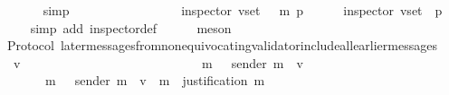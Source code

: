 \begin{isabellebody}
\ \ \ \ \ \ \isamarkupfalse%
\ simp\ \ \ \ \ \ \ \ \ \isanewline
\ \ \isamarkupfalse%
\isanewline
\ \ \isamarkupfalse%
\ \isamarkupfalse%
\ {\isachardoublequoteopen}inspector\ {\isacharparenleft}v{\isacharunderscore}set{\isacharcomma}\ {\isasymsigma}\ {\isasymunion}\ {\isacharbraceleft}m{\isacharbraceright}{\isacharcomma}\ p{\isacharparenright}{\isachardoublequoteclose}\isanewline
\ \ \ \ \isamarkupfalse%
\ {\isacartoucheopen}inspector\ {\isacharparenleft}v{\isacharunderscore}set{\isacharcomma}\ {\isasymsigma}{\isacharcomma}\ p{\isacharparenright}{\isacartoucheclose}\isanewline
\ \ \ \ \isamarkupfalse%
\ {\isacharparenleft}simp\ add{\isacharcolon}\ inspector{\isacharunderscore}def{\isacharparenright}\isanewline
\ \ \ \ \isamarkupfalse%
\ meson\isanewline
{}\isamarkupfalse%
%
\endisatagproof
{\isafoldproof}%
%
\isadelimproof
\isanewline
%
\endisadelimproof
\isanewline
\isanewline
\isanewline
\isanewline
\isanewline
\isanewline
\isanewline
\isanewline
\isanewline
\isanewline
\isanewline
\isanewline
\isanewline
{}\isamarkupfalse%
\ {\isacharparenleft}\ Protocol{\isacharparenright}\ later{\isacharunderscore}messages{\isacharunderscore}from{\isacharunderscore}non{\isacharunderscore}equivocating{\isacharunderscore}validator{\isacharunderscore}include{\isacharunderscore}all{\isacharunderscore}earlier{\isacharunderscore}messages\ {\isacharcolon}\isanewline
\ \ {\isachardoublequoteopen}{\isasymforall}\ v\ {\isasymsigma}\ {\isasymsigma}{}\ {\isasymsigma}{}{\isachardot}\ {\isasymsigma}\ {\isasymin}\ {\isasymSigma}\ {\isasymand}\ {\isasymsigma}{}\ {\isasymin}\ {\isasymSigma}\ {\isasymand}\ {\isasymsigma}{}\ {\isasymsubseteq}\ {\isasymsigma}\ {\isasymand}\ {\isasymsigma}{}\ {\isasymsubseteq}\ {\isasymsigma}\ {\isasymand}\ {\isasymsigma}{}\ {\isasyminter}\ {\isasymsigma}{}\ {\isacharequal}\ {\isasymemptyset}\isanewline
\ \ {\isasymlongrightarrow}\ {\isacharparenleft}{\isasymforall}\ m{}\ {\isasymin}\ {\isasymsigma}{}{\isachardot}\ sender\ m{}\ {\isacharequal}\ v\ \isanewline
\ \ \ \ \ \ {\isasymlongrightarrow}\ {\isacharparenleft}{\isasymforall}\ m{}\ {\isasymin}\ {\isasymsigma}{}{\isachardot}\ sender\ m{}\ {\isacharequal}\ v\ {\isasymlongrightarrow}\ m{}\ {\isasymin}\ justification\ m{}{\isacharparenright}{\isacharparenright}{\isachardoublequoteclose}\isanewline

\end{isabellebody}
